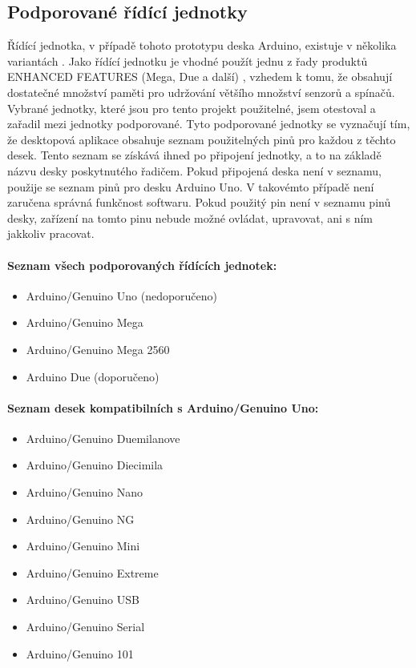 \documentclass[FM,DP]{tulthesis}  %
\begin{document}
\subsection{Podporované řídící jednotky}
Řídící jednotka, v případě tohoto prototypu deska Arduino, existuje v několika variantách \cite{ArduinoProducts}. Jako řídící jednotku je vhodné použít jednu z řady produktů ENHANCED FEATURES (Mega, Due a další) \cite{ArduinoProducts}, vzhedem k tomu, že obsahují dostatečné množství paměti \cite{CompareBoardSpecs} pro udržování většího množství senzorů a spínačů. Vybrané jednotky, které jsou pro tento projekt použitelné, jsem otestoval a zařadil mezi jednotky podporované. Tyto podporované jednotky se vyznačují tím, že desktopová aplikace obsahuje seznam použitelných pinů pro každou z těchto desek. Tento seznam se získává ihned po připojení jednotky, a to na základě názvu desky poskytnutého řadičem. Pokud připojená deska není v seznamu, použije se seznam pinů pro desku Arduino Uno. V takovémto případě není zaručena správná funkčnost softwaru. Pokud použitý pin není v seznamu pinů desky, zařízení na tomto pinu nebude možné ovládat, upravovat, ani s ním jakkoliv pracovat.

\paragraph{Seznam všech podporovaných řídících jednotek:}
\begin{itemize}
\item Arduino/Genuino Uno (nedoporučeno)
\item Arduino/Genuino Mega
\item Arduino/Genuino Mega 2560
\item Arduino Due (doporučeno)
\end{itemize}

\paragraph{Seznam desek kompatibilních s Arduino/Genuino Uno:}
\begin{itemize}
\item Arduino/Genuino Duemilanove
\item Arduino/Genuino Diecimila
\item Arduino/Genuino Nano
\item Arduino/Genuino NG
\item Arduino/Genuino Mini
\item Arduino/Genuino Extreme
\item Arduino/Genuino USB
\item Arduino/Genuino Serial
\item Arduino/Genuino 101
\end{itemize}
\end{document}
